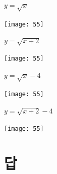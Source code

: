 \documentclass[a4paper]{oblivoir}
\let\oldsection\section
\renewcommand\section{\clearpage\oldsection}
\begin{document}
\clearpage
\begin{minipage}{0.45\textwidth}\centering
\(y=\sqrt x\)
\par\bigskip\texttt{[image: 55]}
\end{minipage}
\begin{minipage}{0.45\textwidth}\centering
\(y=\sqrt{x+2}\)
\par\bigskip\texttt{[image: 55]}
\end{minipage}\bigskip\bigskip\par
\begin{minipage}{0.45\textwidth}\centering
\(y=\sqrt{x}-4\)
\par\bigskip\texttt{[image: 55]}
\end{minipage}
\begin{minipage}{0.45\textwidth}\centering
\(y=\sqrt{x+2}-4\)
\par\bigskip\texttt{[image: 55]}
\end{minipage}\bigskip\bigskip\par

\section*{답}
\end{document}
